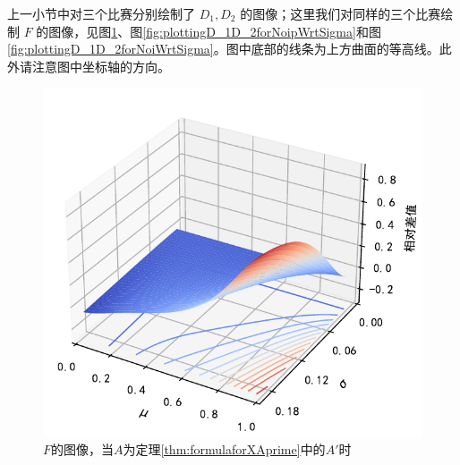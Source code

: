             \vspace{1.5ex}

            上一小节中对三个比赛分别绘制了 $D_1,D_2$ 的图像；这里我们对同样的三个比赛绘制 $F$ 的图像，见图\ref{fig:plottingD_1D_2forAprimeWrtSigma}、图\ref{fig:plottingD_1D_2forNoipWrtSigma}和图\ref{fig:plottingD_1D_2forNoiWrtSigma}。图中底部的线条为上方曲面的等高线。此外请注意图中坐标轴的方向。

            \begin{figure}[p]
                \centering
                \includegraphics[width=\textwidth]{fig/plottingD_1D_2WrtSigma.pdf}
                \caption{$F$的图像，当$A$为定理\ref{thm:formulaforXAprime}中的$A'$时}
                \label{fig:plottingD_1D_2forAprimeWrtSigma}
            \end{figure}

